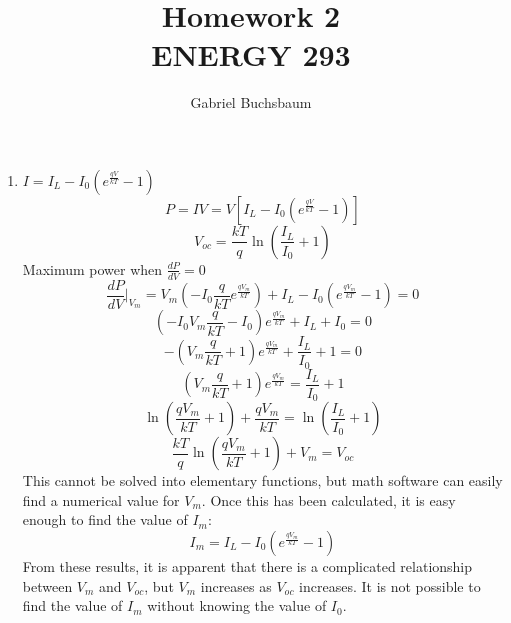 \documentclass[fleqn]{article}
\title{Homework 2\\ENERGY 293}
\author{Gabriel Buchsbaum}
\begin{document}
\lstset{language=Matlab}

\maketitle

\begin{enumerate}
\item \quad \quad \quad $I = I_L - I_0 \left(e^{\frac{qV}{kT}}-1\right)$
  \begin{equation*}
    P=IV=V\left[I_L - I_0 \left(e^{\frac{qV}{kT}}-1\right)\right]
  \end{equation*}
  \begin{equation*}
    V_{oc} = \frac{kT}{q}\ln\left(\frac{I_L}{I_0}+1\right)
  \end{equation*}
  Maximum power when $\frac{dP}{dV}=0$
  \begin{equation*}
    \frac{dP}{dV}\Bigr|_{V_m} = V_m\left(-I_0 \frac{q}{kT} e^{\frac{qV_m}{kT}} \right) + I_L - I_0 \left(e^{\frac{qV_m}{kT}}-1\right)=0
  \end{equation*}
  \begin{equation*}
    \left(-I_0 V_m \frac{q}{kT} - I_0\right)e^{\frac{qV_m}{kT}} + I_L + I_0 = 0
  \end{equation*}
  \begin{equation*}
    -\left(V_m \frac{q}{kT} + 1\right)e^{\frac{qV_m}{kT}} + \frac{I_L}{I_0} + 1 = 0
  \end{equation*}
  \begin{equation*}
    \left(V_m \frac{q}{kT} + 1\right)e^{\frac{qV_m}{kT}} = \frac{I_L}{I_0} + 1
  \end{equation*}
  \begin{equation*}
    \ln \left(\frac{qV_m}{kT} + 1\right) + \frac{qV_m}{kT} = \ln\left(\frac{I_L}{I_0}+1\right)
  \end{equation*}
  \begin{equation*}
    \frac{kT}{q}\ln \left(\frac{qV_m}{kT} + 1\right) + V_m = V_{oc}
  \end{equation*}
  This cannot be solved into elementary functions, but math software can easily find a numerical value for $V_m$.  Once this has been calculated, it is easy enough to find the value of $I_m$:
  \begin{equation*}
    I_m = I_L - I_0 \left(e^{\frac{qV_m}{kT}}-1\right)
  \end{equation*}
  From these results, it is apparent that there is a complicated relationship between $V_m$ and $V_{oc}$, but $V_m$ increases as $V_{oc}$ increases. It is not possible to find the value of $I_m$ without knowing the value of $I_0$.


\end{enumerate}
\end{document}
